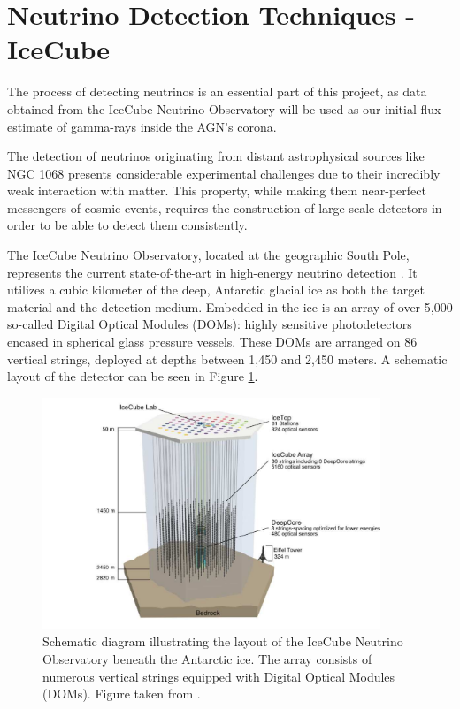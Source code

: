 \section{Neutrino Detection Techniques - IceCube}
\label{sec:Neutrino_Detection}

The process of detecting neutrinos is an essential part of this project, as data obtained from the IceCube Neutrino Observatory will be used as our initial flux estimate of gamma-rays inside the AGN's corona.

The detection of neutrinos originating from distant astrophysical sources like NGC 1068 presents considerable experimental challenges due to their incredibly weak interaction with matter. This property, while making them near-perfect messengers of cosmic events, requires the construction of large-scale detectors in order to be able to detect them consistently.

The IceCube Neutrino Observatory, located at the geographic South Pole, represents the current state-of-the-art in high-energy neutrino detection \citep{IceCubeOverview2017}. It utilizes a cubic kilometer of the deep, Antarctic glacial ice as both the target material and the detection medium. Embedded in the ice is an array of over 5,000 so-called Digital Optical Modules (DOMs): highly sensitive photodetectors encased in spherical glass pressure vessels. These DOMs are arranged on 86 vertical strings, deployed at depths between 1,450 and 2,450 meters. A schematic layout of the detector can be seen in Figure \ref{fig:IceCube_layout}.

\begin{figure}[H]
    \centering
    \includegraphics[width=0.9\textwidth]{Figures/IceCube_Layout.pdf}
    \caption{Schematic diagram illustrating the layout of the IceCube Neutrino Observatory beneath the Antarctic ice. The array consists of numerous vertical strings equipped with Digital Optical Modules (DOMs). Figure taken from \citet{IceCubeOverview2017}.}
    \label{fig:IceCube_layout}
\end{figure}


